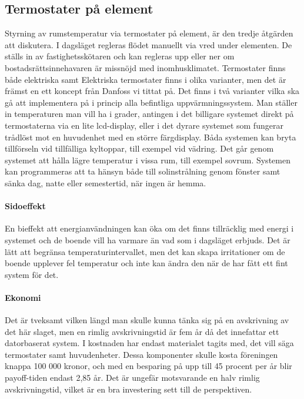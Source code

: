 \subsection{Termostater på element}
Styrning av rumstemperatur via termostater på element, är den tredje åtgärden att diskutera. I dagsläget regleras flödet manuellt via vred under elementen. De ställs in av fastighetsskötaren och kan regleras upp eller ner om bostadsrättsinnehavaren är missnöjd med inomhusklimatet. Termostater finns både elektriska samt 
Elektriska termostater finns i olika varianter, men det är främst en ett koncept från Danfoss vi tittat på. Det finns i två varianter vilka ska gå att implementera på i princip alla befintliga uppvärmningssystem. Man ställer in temperaturen man vill ha i grader, antingen i det billigare systemet direkt på termostaterna via en lite lcd-display, eller i det dyrare systemet som fungerar trådlöst mot en huvudenhet med en större färgdisplay.
Båda systemen kan bryta tillförseln vid tillfälliga kyltoppar, till exempel vid vädring. Det går genom systemet att hålla lägre temperatur i vissa rum, till exempel sovrum. Systemen kan programmeras att ta hänsyn både till solinstrålning genom fönster samt sänka dag, natte eller semestertid, när ingen är hemma.

\paragraph{Sidoeffekt}
En bieffekt att energianvändningen kan öka om det finns tillräcklig med energi i systemet och de boende vill ha varmare än vad som i dagsläget erbjuds. Det är lätt att begränsa temperaturintervallet, men det kan skapa irritationer om de boende upplever fel temperatur och inte kan ändra den när de har fått ett fint system för det.

\paragraph{Ekonomi}
Det är tveksamt vilken längd man skulle kunna tänka sig på en avskrivning av det här slaget, men en  rimlig avskrivningstid är fem år då det innefattar ett datorbaserat system. I kostnaden har endast materialet tagits med, det vill säga termostater samt huvudenheter. Dessa komponenter skulle kosta föreningen knappa 100 000 kronor, och med en besparing på upp till 45 procent per år blir payoff-tiden endast 2,85 år. Det är ungefär motsvarande en halv rimlig avskrivningstid, vilket är en bra investering sett till de perspektiven.

